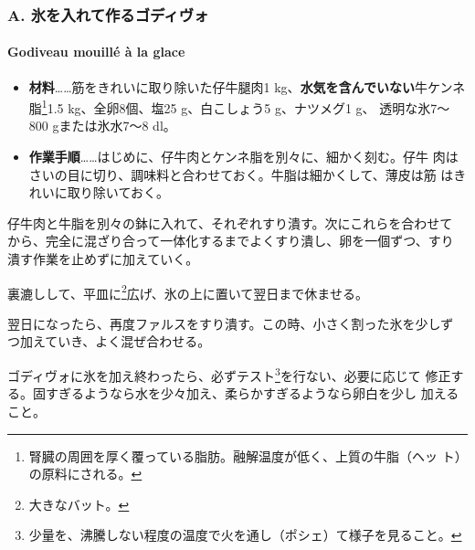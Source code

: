  
\begin{recette}
\hypertarget{a.-ux6c37ux3092ux5165ux308cux3066ux4f5cux308bux30b4ux30c7ux30a3ux30f4ux30a9}{%
\subsubsection{A.
氷を入れて作るゴディヴォ}\label{a.-ux6c37ux3092ux5165ux308cux3066ux4f5cux308bux30b4ux30c7ux30a3ux30f4ux30a9}}

\hypertarget{godiveau-mouilluxe9-uxe0-la-glace}{%
\paragraph{Godiveau mouillé à la
glace}\label{godiveau-mouilluxe9-uxe0-la-glace}}


\begin{itemize}
\item
  \textbf{材料}\ldots{}\ldots{}筋をきれいに取り除いた仔牛腿肉1
  kg、\textbf{水気を含んでいない}牛ケンネ脂\footnote{腎臓の周囲を厚く覆っている脂肪。融解温度が低く、上質の牛脂（ヘッ
    ト）の原料にされる。}1.5 kg、全卵8個、塩25 g、白こしょう5
  g、ナツメグ1 g、 透明な氷7〜800 gまたは氷水7〜8 dl。
\item
  \textbf{作業手順}\ldots{}\ldots{}はじめに、仔牛肉とケンネ脂を別々に、細かく刻む。仔牛
  肉はさいの目に切り、調味料と合わせておく。牛脂は細かくして、薄皮は筋
  はきれいに取り除いておく。
\end{itemize}

仔牛肉と牛脂を別々の鉢に入れて、それぞれすり潰す。次にこれらを合わせて
から、完全に混ざり合って一体化するまでよくすり潰し、卵を一個ずつ、すり
潰す作業を止めずに加えていく。

裏漉しして、平皿に\footnote{大きなバット。}広げ、氷の上に置いて翌日まで休ませる。

翌日になったら、再度ファルスをすり潰す。この時、小さく割った氷を少しず
つ加えていき、よく混ぜ合わせる。

ゴディヴォに氷を加え終わったら、必ずテスト\footnote{少量を、沸騰しない程度の温度で火を通し（ポシェ）て様子を見ること。}を行ない、必要に応じて
修正する。固すぎるようなら水を少々加え、柔らかすぎるようなら卵白を少し
加えること。
\end{recette}